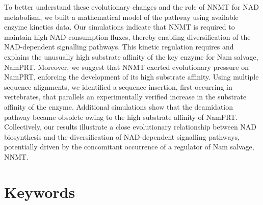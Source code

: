 To better understand these evolutionary changes and the role of NNMT for NAD metabolism, we built a mathematical model of the pathway using available enzyme kinetics data. Our simulations indicate that NNMT is required to maintain high NAD consumption fluxes, thereby enabling diversification of the NAD-dependent signalling pathways. This kinetic regulation requires and explains the unusually high substrate affinity of the key enzyme for Nam salvage, NamPRT. Moreover, we suggest that NNMT exerted evolutionary pressure on NamPRT, enforcing the development of its high substrate affinity. Using multiple sequence alignments, we identified a sequence insertion, first occurring in vertebrates, that parallels an experimentally verified increase in the substrate affinity of the enzyme. Additional simulations show that the deamidation pathway became obsolete owing to the high substrate affinity of NamPRT. Collectively, our results illustrate a close evolutionary relationship between NAD biosynthesis and the diversification of NAD-dependent signalling pathways, potentially driven by the concomitant occurrence of a regulator of Nam salvage, NNMT.


\section*{Keywords}
